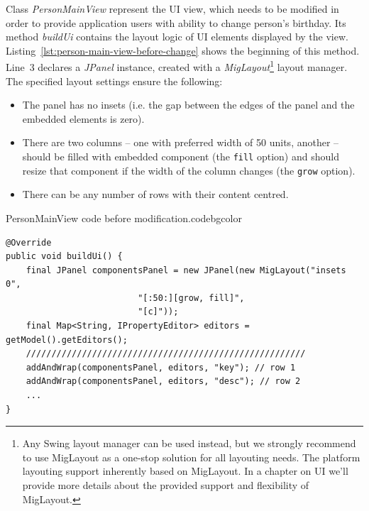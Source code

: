   Class \emph{PersonMainView} represent the UI view, which needs to be modified in order to provide application users with ability to change person's birthday.
  Its method \emph{buildUi} contains the layout logic of UI elements displayed by the view.
  Listing~\ref{lst:person-main-view-before-change} shows the beginning of this method.
  Line~3 declares a \emph{JPanel} instance, created with a \emph{MigLayout}\footnote{Any Swing layout manager can be used instead, but we strongly recommend to use MigLayout as a one-stop solution for all layouting needs. 
	    The platform layouting support inherently based on MigLayout. 
	    In a chapter on UI we'll provide more details about the provided support and flexibility of MigLayout.} 
  layout manager.
  The specified layout settings ensure the following:
  \begin{itemize}
    \item The panel has no insets (i.e. the gap between the edges of the panel and the embedded elements is zero).
    \item There are two columns -- one with preferred width of 50 units, another -- should be filled with embedded component (the \texttt{fill} option) and should resize that component if the width of the column changes (the \texttt{grow} option).
    \item There can be any number of rows with their content centred.
  \end{itemize}

 \begin{code}{PersonMainView code before modification.}{\label{lst:person-main-view-before-change}}{codebgcolor}
    \begin{lstlisting}
@Override
public void buildUi() {
    final JPanel componentsPanel = new JPanel(new MigLayout("insets 0", 
						  "[:50:][grow, fill]", 
						  "[c]"));
    final Map<String, IPropertyEditor> editors = getModel().getEditors();
    ///////////////////////////////////////////////////////    
    addAndWrap(componentsPanel, editors, "key"); // row 1
    addAndWrap(componentsPanel, editors, "desc"); // row 2
    ...
}
    \end{lstlisting}
  \end{code}

